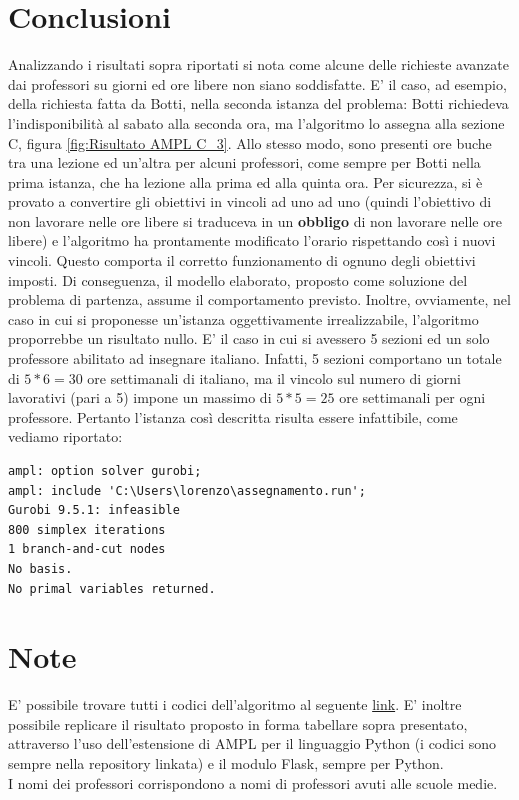 \documentclass{article}
\begin{document}
\section{Conclusioni}
Analizzando i risultati sopra riportati si nota come alcune delle richieste avanzate dai professori su giorni ed ore libere non siano soddisfatte. E' il caso, ad esempio, della richiesta fatta da Botti, nella seconda istanza del problema: Botti richiedeva l'indisponibilità al sabato alla seconda ora, ma l'algoritmo lo assegna alla sezione C, figura \ref{fig:Risultato AMPL C_3}. Allo stesso modo, sono presenti ore buche tra una lezione ed un'altra per alcuni professori, come sempre per Botti nella prima istanza, che ha lezione alla prima ed alla quinta ora. Per sicurezza, si è provato a convertire gli obiettivi in vincoli ad uno ad uno (quindi l'obiettivo di non lavorare nelle ore libere si traduceva in un \textbf{obbligo} di non lavorare nelle ore libere) e l'algoritmo ha prontamente modificato l'orario rispettando così i nuovi vincoli. Questo comporta il corretto funzionamento di ognuno degli obiettivi imposti. Di conseguenza, il modello elaborato, proposto come soluzione del problema di partenza, assume il comportamento previsto. Inoltre, ovviamente, nel caso in cui si proponesse un'istanza oggettivamente irrealizzabile, l'algoritmo proporrebbe un risultato nullo. E' il caso in cui si avessero 5 sezioni ed un solo professore abilitato ad insegnare italiano. Infatti, 5 sezioni comportano un totale di $5*6=30$ ore settimanali di italiano, ma il vincolo sul numero di giorni lavorativi (pari a 5) impone un massimo di $5*5=25$ ore settimanali per ogni professore. Pertanto l'istanza così descritta risulta essere infattibile, come vediamo riportato: 

\begin{verbatim}
ampl: option solver gurobi;
ampl: include 'C:\Users\lorenzo\assegnamento.run';
Gurobi 9.5.1: infeasible
800 simplex iterations
1 branch-and-cut nodes
No basis.
No primal variables returned.
\end{verbatim}


\section{Note}
E' possibile trovare tutti i codici dell'algoritmo al seguente \href{https://github.com/FilippoBotti/RicercaOperativa}{link}.
E' inoltre possibile replicare il risultato proposto in forma tabellare sopra presentato, attraverso l'uso dell'estensione di AMPL per il linguaggio Python (i codici sono sempre nella repository linkata) e il modulo Flask, sempre per Python.
\\I nomi dei professori corrispondono a nomi di professori avuti alle scuole medie.
\end{document}

